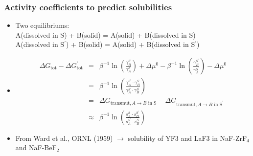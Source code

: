 \documentclass{beamer}
\begin{document}
\begin{frame}
    \frametitle{Activity coefficients to predict solubilities}
    \begin{itemize}
        \item Two equilibriums:\\
            A(dissolved in S) + B(solid) = A(solid) + B(dissolved in S)\\
            A(dissolved in S$^\prime$) + B(solid) = A(solid) + B(dissolved in S$^\prime$)
        \item
            \begin{eqnarray}
                \Delta G_\text{tot} - \Delta G_\text{tot}^\prime &=& \beta^{-1}\ln\left(\frac{\gamma_B^S}{\gamma_A^S}\right) + \Delta \mu ^0  - \beta^{-1}\ln\left(\frac{\gamma_B^{S^\prime}}{\gamma_A^{S^\prime}}\right) - \Delta \mu ^0 \\ \nonumber
                &=& \beta^{-1}\ln\left(\frac{\gamma_A^{S^{\prime}}\cdot\gamma_B^S}{\gamma_A^S\cdot\gamma_B^{S^\prime}}\right) \\ \nonumber
                &=& \Delta G_{\text{transmut},A\rightarrow B\text{ in S}} - \Delta G_{\text{transmut},A\rightarrow B\text{ in S}^{\prime}} \\ \nonumber
                &\approx & \beta^{-1}\ln\left(\frac{s_A^S\cdot s_B^{S^\prime}}{s_A^{S^{\prime}}\cdot s_B^S}\right)   \nonumber
            \end{eqnarray}
        \item From Ward et al., ORNL (1959) $\rightarrow$ solubility of YF3 and LaF3 in NaF-ZrF$_4$ and NaF-BeF$_2$
    \end{itemize}
\end{frame}
\end{document}
